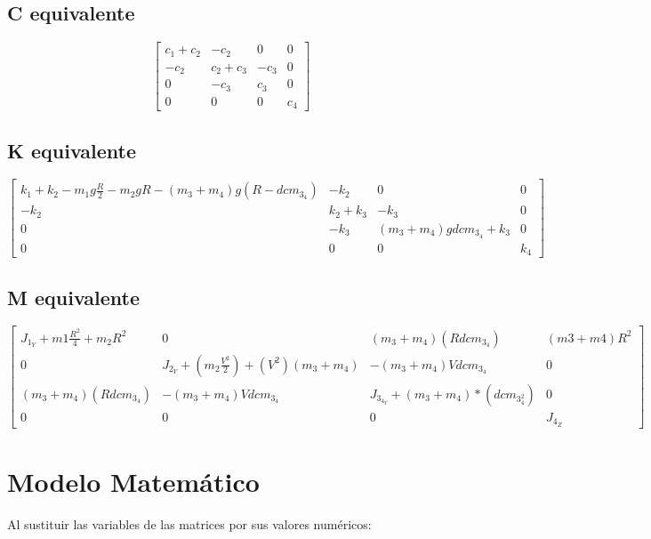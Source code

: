 \documentclass{aleph-revista}
\begin{document}
{\subsection{C equivalente}   
\begin{equation}
\begin{bmatrix}
c_1+c_2 & -c_2 & 0 & 0\\
-c_2 & c_2+c_3 & -c_3 & 0\\
0 & -c_3 & c_3 & 0\\
0 & 0 & 0 & c_4
\end{bmatrix}
\end{equation} 

\subsection{K equivalente}   
\begin{equation}
\begin{bmatrix}
k_1+k_2-m_1g\frac{R}{2}-m_2gR-(m_3+m_4)g(R-dcm_3_4) & -k_2 & 0 & 0\\
-k_2 & k_2+k_3 & -k_3 & 0\\
0 & -k_3 & (m_3+m_4)gdcm_3_4 + k_3 & 0\\
0 & 0 & 0 & k_4
\end{bmatrix}
\end{equation}

\subsection{M equivalente}   
\begin{equation}
\begin{bmatrix}
J_1_Y + m1\frac{R^2}{4}+m_2R^2 & 0 & (m_3+m_4)(Rdcm_3_4) & (m3+m4)R^2\\
0 &J_2_Y+(m_2\frac{V^2}{2})+(V^2)(m_3+m_4) &-(m_3+m_4)Vdcm_3_4 & 0 \\
(m_3+m_4)(Rdcm_3_4) & -(m_3+m_4)Vdcm_3_4 & J_3_4_Y+(m_3+m_4)*(dcm_3_4^2) & 0\\
0 & 0 & 0 & J_4_Z
\end{bmatrix}
\end{equation}

\section{Modelo Matemático}

Al sustituir las variables de las matrices por sus valores numéricos:

}
\end{document}
